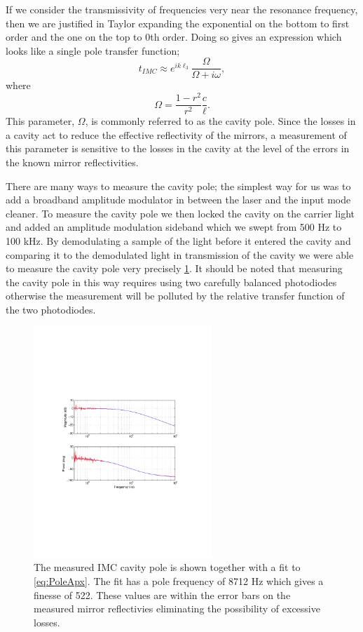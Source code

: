 \documentclass[10pt,a4paper]{article}
\begin{document}
If we consider the transmissivity of frequencies very near the resonance frequency, 
then we are justified in Taylor expanding the exponential on the bottom to first order 
and the one on the top to 0th order.
Doing so gives an expression which looks like a single pole transfer function;
\begin{equation}
	t_{IMC}\approx e^{ik\ell_3}\frac{\Omega}{\Omega+i\omega},
	\label{eq:PoleApx}
\end{equation}
where
\begin{equation}
	\Omega=\frac{1-r^2}{r^2}\frac{c}{\ell}.
\end{equation}
This parameter, $\Omega$, is commonly referred to as the cavity pole.  
Since the losses in a cavity act to reduce the effective reflectivity of the mirrors, 
a measurement of this parameter is sensitive to the losses in the cavity at the level 
of the errors in the known mirror reflectivities.

There are many ways to measure the cavity pole; 
the simplest way for us was to add a broadband amplitude modulator in between the laser 
and the input mode cleaner.  
To measure the cavity pole we then locked the cavity on the carrier light and added 
an amplitude modulation sideband which we swept from 500 Hz to 100 kHz.  
By demodulating a sample of the light before it entered the cavity and comparing 
it to the demodulated light in transmission of the cavity we were able to 
measure the cavity pole very precisely \ref{fig:cavPole}.  
It should be noted that measuring the cavity pole in this way requires using two 
carefully balanced photodiodes otherwise the measurement will be polluted by the 
relative transfer function of the two photodiodes.

\begin{figure}	
	\centering
	\includegraphics[width = 0.6\textwidth]{IMCpole_ugly.pdf}
	\caption{The measured IMC cavity pole is shown together with a fit 
		to \eqref{eq:PoleApx}.  The fit has a pole frequency of 8712 Hz 
		which gives a finesse of 522.  These values are within the error 
		bars on the measured mirror reflectivies eliminating the 
		possibility of excessive losses.}
	\label{fig:cavPole}
\end{figure}
\end{document}
